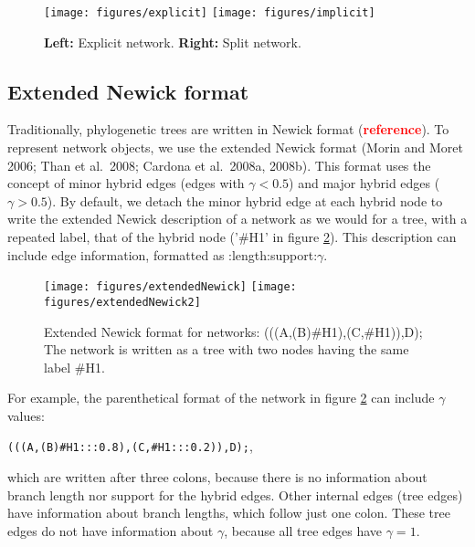 \documentclass[]{article}
\begin{document}
\begin{figure}

{\centering \texttt{[image: figures/explicit]} \texttt{[image: figures/implicit]} 

}

\caption{\textbf{Left:} Explicit network. \textbf{Right:} Split network.}\label{fig:nettypes}
\end{figure}

\vspace{-0.25cm}

\hypertarget{extended-newick-format}{%
\subsection{Extended Newick format}\label{extended-newick-format}}

Traditionally, phylogenetic trees are written in Newick format
(\textcolor{red}{\textbf{reference}}). To represent network objects, we
use the extended Newick format (Morin and Moret 2006; Than et al.~2008;
Cardona et al.~2008a, 2008b). This format uses the concept of minor
hybrid edges (edges with \(\gamma < 0.5\)) and major hybrid edges
(\(\gamma > 0.5\)). By default, we detach the minor hybrid edge at each
hybrid node to write the extended Newick description of a network as we
would for a tree, with a repeated label, that of the hybrid node ('\#H1'
in figure \ref{fig:netNewick}). This description can include edge
information, formatted as :length:support:\(\gamma\).

\begin{figure}[H]

{\centering \texttt{[image: figures/extendedNewick]} \texttt{[image: figures/extendedNewick2]} 

}

\caption{Extended Newick format for networks: (((A,(B)\#H1),(C,\#H1)),D); The network is written as a tree with two nodes having the same label \#H1.}\label{fig:netNewick}
\end{figure}

For example, the parenthetical format of the network in figure
\ref{fig:netNewick} can include \(\gamma\) values:

\texttt{(((A,(B)\#H1:::0.8),(C,\#H1:::0.2)),D);},

which are written after three colons, because there is no information
about branch length nor support for the hybrid edges. Other internal
edges (tree edges) have information about branch lengths, which follow
just one colon. These tree edges do not have information about
\(\gamma\), because all tree edges have \(\gamma=1\).
\end{document}
